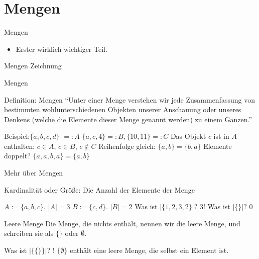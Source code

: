 \section{Mengen}


\begin{frame}{Mengen}
	\begin{itemize}
		\pause\item Erster wirklich wichtiger Teil.
	\end{itemize}
\end{frame}

\begin{frame}{Mengen}
	Zeichnung
\end{frame}

\begin{frame}{Mengen}
	\begin{block}{Definition: Mengen}
		\pause
		``Unter einer Menge \pause verstehen wir jede
		Zusammenfassung \pause von bestimmten \pause
		wohlunterschiedenen \pause Objekten \pause unserer
		Anschauung oder unseres Denkens \pause (welche die
		Elemente dieser Menge genannt werden) \pause zu einem
		Ganzen.''
	\end{block}
	
	
	\begin{itemize}
		\pitem Beispiel:\pause $\{a, b, c, d\}$ \pause $ =: A$ \pause $\{a, c, 4\} =: B, \{10, 11\} =: C$
		\pitem Das Objekt $c$ ist in $A$ enthalten\pause : $c \in A$\pause , $c \in B$\pause , $c \notin C$
		\pitem Reihenfolge gleich\pause : $\{a, b\} = \{b, a\}$
		\pitem Elemente doppelt? \pause $\{a, a, b, a\} = \{a, b\}$
	\end{itemize}
\end{frame}

\begin{frame}{Mehr über Mengen}
	\begin{itemize}
		\pitem Kardinalität \pause oder Größe\pause : Die Anzahl der Elemente der Menge
		\begin{itemize}
			\pitem $A := \{a, b, c\}$\pause . $|A| = 3$
			\pitem $B := \{c, d\}$\pause . $|B| = 2$
			\pitem Was ist $|\{1, 2, 3, 2\}|$? \pause $3$!
			\pitem Was ist $|\{\}|?$ \pause $0$
		\end{itemize}
	\end{itemize}
	
	\pause
	
	\begin{block}{Leere Menge}
		Die Menge, die nichts enthält, nennen wir die leere Menge\pause , und schreiben sie als $\{\}$ oder $\emptyset$.
	\end{block}
	
	\pause
	
	Was ist $|\{\{\}\}|$? ! \pause $\{\emptyset\}$ enthält eine leere Menge, die selbst ein Element ist.
\end{frame}


